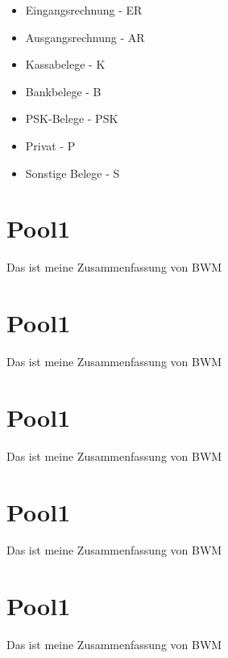 \documentclass[letterpaper,10pt,english]{sphinxmanual}
\begin{document}
\begin{DUlineblock}{0em}
\item[] 
\item[] 
\end{DUlineblock}
\begin{itemize}
\item {} 
Eingangsrechnung - ER

\item {} 
Ausgangsrechnung - AR

\item {} 
Kassabelege - K

\item {} 
Bankbelege - B

\item {} 
PSK-Belege - PSK

\item {} 
Privat - P

\item {} 
Sonstige Belege - S

\end{itemize}

\begin{DUlineblock}{0em}
\item[] 
\end{DUlineblock}


\chapter{Pool1}
\label{\detokenize{pool2:pool1}}\label{\detokenize{pool2::doc}}
Das ist meine Zusammenfassung von BWM


\chapter{Pool1}
\label{\detokenize{pool3:pool1}}\label{\detokenize{pool3::doc}}
Das ist meine Zusammenfassung von BWM


\chapter{Pool1}
\label{\detokenize{pool4:pool1}}\label{\detokenize{pool4::doc}}
Das ist meine Zusammenfassung von BWM


\chapter{Pool1}
\label{\detokenize{pool5:pool1}}\label{\detokenize{pool5::doc}}
Das ist meine Zusammenfassung von BWM


\chapter{Pool1}
\label{\detokenize{pool6:pool1}}\label{\detokenize{pool6::doc}}
Das ist meine Zusammenfassung von BWM



\renewcommand{\indexname}{Index}
\printindex
\end{document}
